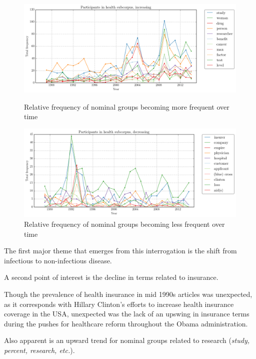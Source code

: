     \begin{figure}[htb!]
    \centering
    \begin{minipage}{.48\textwidth}
    \centering
    \includegraphics[width=.95\textwidth]{../images/3.png}
    \caption{Relative frequency of nominal groups becoming more frequent over time}
    \label{fig:3}
    \end{minipage}%
    \begin{minipage}{.48\textwidth}
    \centering
    \includegraphics[width=.95\textwidth]{../images/4.png}
    \caption{Relative frequency of nominal groups becoming less frequent over time}
    \label{fig:4}
    \end{minipage}
    \end{figure}

The first major theme that emerges from this interrogation is the shift from infectious to non-infectious disease.

A second point of interest is the decline in terms related to insurance.

Though the prevalence of health insurance in mid 1990s articles was unexpected, as it corresponds with Hillary Clinton's efforts to increase health insurance coverage in the USA, unexpected was the lack of an upswing in insurance terms during the pushes for healthcare reform throughout the Obama administration.

Also apparent is an upward trend for nominal groups related to research (\emph{study, percent, research, etc.}).

